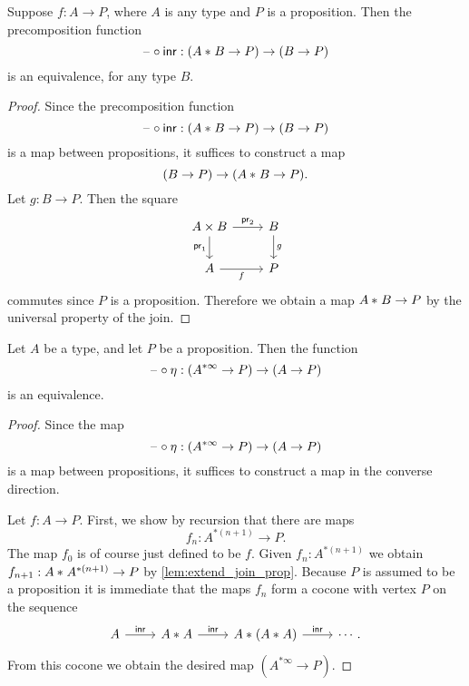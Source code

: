 \begin{lem}\label{lem:extend_join_prop}
Suppose $f:A\to P$, where $A$ is any type and $P$ is a proposition.
Then the precomposition function
\begin{equation*}
\mathord{\hspace{1pt}\text{--}\hspace{1pt}}\circ{\mathsf{inr}}:({A}\ast_{}{B}\to P)\to (B\to P)
\end{equation*}
is an equivalence, for any type $B$.
\end{lem}

\begin{proof}
  Since the precomposition function
  \begin{equation*}
    \mathord{\hspace{1pt}\text{--}\hspace{1pt}}\circ{\mathsf{inr}}:({A}\ast_{}{B}\to P)\to (B\to P)
  \end{equation*}
  is a map between propositions, it suffices to construct a map
  \begin{equation*}
    (B\to P)\to ({A}\ast_{}{B}\to P).
  \end{equation*}
  Let $g:B\to P$. Then the square
  \begin{equation*}
    \begin{tikzcd}
      A\times B \arrow[r,"\proj 2"] \arrow[d,swap,"\proj 1"] & B \arrow[d,"g"] \\
      A \arrow[r,swap,"f"] & P
    \end{tikzcd}
  \end{equation*}
  commutes since $P$ is a proposition. Therefore we obtain a map ${A}\ast_{}{B}\to P$ by the universal property of the join.
\end{proof}

\begin{prp}\label{prp:universal-property-brck}
Let $A$ be a type, and let $P$ be a proposition. Then the function
\begin{equation*}
\mathord{\hspace{1pt}\text{--}\hspace{1pt}}\circ \eta : (A^{\ast\infty}\to P)\to (A\to P)
\end{equation*}
is an equivalence. 
\end{prp}

\begin{proof}
  Since the map
  \begin{equation*}
    \mathord{\hspace{1pt}\text{--}\hspace{1pt}}\circ \eta : (A^{\ast\infty}\to P)\to (A\to P)
  \end{equation*}
  is a map between propositions, it suffices to construct a map in the converse direction.

  Let $f:A\to P$. First, we show by recursion that there are maps
  \begin{equation*}
    f_n:A^{\ast(n+1)}\to P.
  \end{equation*}
  The map $f_0$ is of course just defined to be $f$. Given $f_n:A^{\ast(n+1)}$ we obtain $f_{n+1}:{A}\ast_{}{A^{\ast(n+1)}}\to P$ by \cref{lem:extend_join_prop}. Because $P$ is assumed to be a proposition it is immediate that the maps $f_n$ form a cocone with vertex $P$ on the sequence
  \begin{equation*}
    \begin{tikzcd}
      A \arrow[r,"\inr"] & \join{A}{A} \arrow[r,"\inr"] & \join{A}{(\join{A}{A})} \arrow[r,"\inr"] & \cdots.
    \end{tikzcd}
  \end{equation*}
  From this cocone we obtain the desired map $(A^{\ast\infty}\to P)$.
\end{proof}


